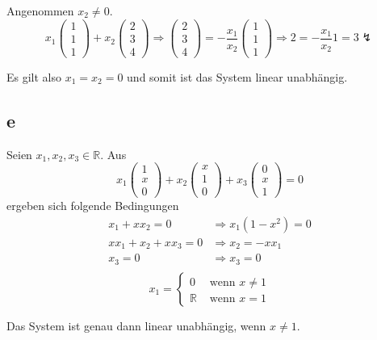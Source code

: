 \documentclass[a4paper,10pt]{article}
\begin{document}
Angenommen $x_2 \ne 0$.
\begin{equation*}
 x_1\begin{pmatrix}1\\1\\1\end{pmatrix} + x_2\begin{pmatrix}2\\3\\4\end{pmatrix} \Rightarrow \begin{pmatrix}2\\3\\4\end{pmatrix} = -\frac{x_1}{x_2}\begin{pmatrix}1\\1\\1\end{pmatrix} \Rightarrow 2 = -\frac{x_1}{x_2}1 = 3 \lightning
\end{equation*}

Es gilt also $x_1 = x_2 = 0$ und somit ist das System linear unabhängig.

\subsection*{e}

Seien $x_1, x_2, x_3 \in \mathbb{R}$.
Aus
\begin{equation*}
 x_1 \begin{pmatrix}1\\x\\0\end{pmatrix} + x_2 \begin{pmatrix}x\\1\\0\end{pmatrix} + x_3 \begin{pmatrix}0\\x\\1\end{pmatrix} = 0
\end{equation*}
ergeben sich folgende Bedingungen
\begin{align*}
 x_1 + xx_2 = 0 & \Rightarrow x_1(1 - x^2) = 0\\
 xx_1 + x_2 + xx_3 = 0 & \Rightarrow x_2 = -xx_1\\
 x_3 = 0 & \Rightarrow x_3 = 0\\
\end{align*}
\begin{equation*}
 x_1 = \begin{cases}
        0 & \text{ wenn } x \ne 1\\
        \mathbb{R} & \text{ wenn } x = 1
       \end{cases}
\end{equation*}

Das System ist genau dann linear unabhängig, wenn $x \ne 1$.
\end{document}
